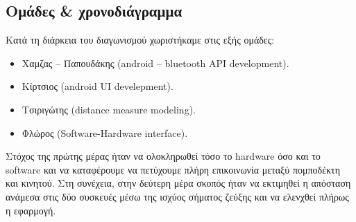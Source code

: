 \subsection{Ομάδες \& χρονοδιάγραμμα}
Κατά τη διάρκεια του διαγωνισμού χωριστήκαμε στις εξής ομάδες:
\begin{itemize}
\item Χαμζας – Παπουδάκης (android – bluetooth API development).
\item Κίρτσιος (android UI develepment).
\item Τσιριγώτης (distance measure modeling).
\item Φλώρος (Software-Hardware interface).
\end{itemize}

Στόχος της πρώτης μέρας ήταν να ολοκληρωθεί τόσο το hardware όσο και το software και να καταφέρουμε να πετύχουμε πλήρη επικοινωνία μεταξύ πομποδέκτη και κινητού.
Στη συνέχεια, στην δεύτερη μέρα σκοπός ήταν να εκτιμηθεί η απόσταση ανάμεσα στις δύο συσκευές μέσω της ισχύος σήματος ζεύξης και να ελενχθεί πλήρως η εφαρμογή.
